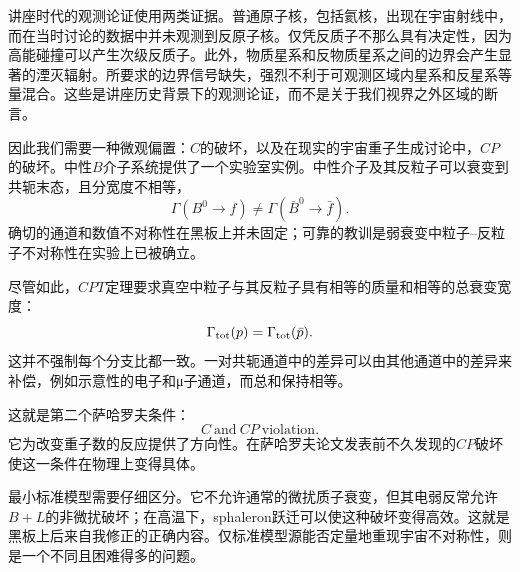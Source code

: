 讲座时代的观测论证使用两类证据。普通原子核，包括氦核，出现在宇宙射线中，而在当时讨论的数据中并未观测到反原子核。仅凭反质子不那么具有决定性，因为高能碰撞可以产生次级反质子。此外，物质星系和反物质星系之间的边界会产生显著的湮灭辐射。所要求的边界信号缺失，强烈不利于可观测区域内星系和反星系等量混合。这些是讲座历史背景下的观测论证，而不是关于我们视界之外区域的断言。

\begin{classroomqa}
\end{classroomqa}

因此我们需要一种微观偏置：\(C\)的破坏，以及在现实的宇宙重子生成讨论中，\(CP\)的破坏。中性\(B\)介子系统提供了一个实验室实例。中性介子及其反粒子可以衰变到共轭末态，且分宽度不相等，
\begin{equation}
\Gamma(B^0\to f)\ne\Gamma(\bar B^0\to\bar f).
\label{eq:c08-cp-partial}
\end{equation}
确切的通道和数值不对称性在黑板上并未固定；可靠的教训是弱衰变中粒子--反粒子不对称性在实验上已被确立。

尽管如此，\(CPT\)定理要求真空中粒子与其反粒子具有相等的质量和相等的总衰变宽度：
\begin{equation}
\Gamma_{\rm tot}(p)=\Gamma_{\rm tot}(\bar p).
\end{equation}
这并不强制每个分支比都一致。一对共轭通道中的差异可以由其他通道中的差异来补偿，例如示意性的电子和{\proseunicodefont μ}子通道，而总和保持相等。

\begin{classroomqa}
\end{classroomqa}

这就是第二个萨哈罗夫条件：
\begin{equation}
\boxed{C\ \text{and}\ CP\ \text{violation}.}
\end{equation}
它为改变重子数的反应提供了方向性。在萨哈罗夫论文发表前不久发现的\(CP\)破坏使这一条件在物理上变得具体。

最小标准模型需要仔细区分。它不允许通常的微扰质子衰变，但其电弱反常允许\(B+L\)的非微扰破坏；在高温下，sphaleron跃迁可以使这种破坏变得高效。这就是黑板上后来自我修正的正确内容。仅标准模型源能否定量地重现宇宙不对称性，则是一个不同且困难得多的问题。

